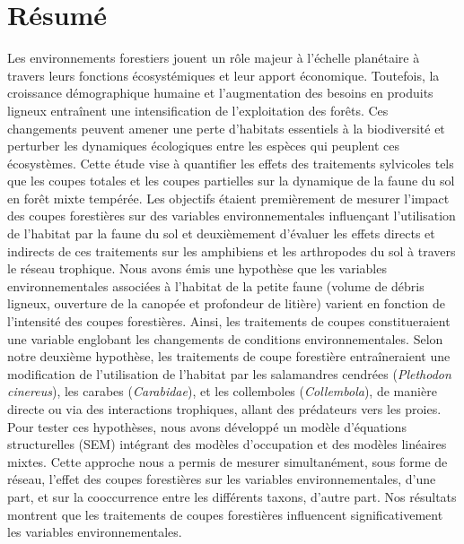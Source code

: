\chapter*{Résumé}               %
\label{chap-resume}             %

Les environnements forestiers jouent un rôle majeur à l’échelle planétaire à travers leurs fonctions écosystémiques et leur apport économique. 
Toutefois, la croissance démographique humaine et l’augmentation des besoins en produits ligneux entraînent une intensification de l'exploitation des forêts. 
Ces changements peuvent amener  une perte d'habitats essentiels à la biodiversité et perturber les dynamiques écologiques entre les espèces qui peuplent ces écosystèmes. 
Cette étude vise à quantifier les effets des traitements sylvicoles tels que les coupes totales et les coupes partielles sur la dynamique de la faune du sol en forêt mixte tempérée. 
Les objectifs étaient premièrement de mesurer l’impact des coupes forestières sur des variables environnementales influençant l’utilisation de l’habitat par la faune du sol 
et deuxièmement d’évaluer les effets directs et indirects de ces traitements sur les amphibiens et les arthropodes du sol à travers le réseau trophique. 
Nous avons émis une hypothèse que les variables environnementales associées à l’habitat de la petite faune (volume de débris ligneux, ouverture de la canopée et profondeur de litière) varient en fonction de l’intensité des coupes forestières. 
Ainsi, les traitements de coupes constitueraient une variable englobant les changements de conditions environnementales. 
Selon notre deuxième hypothèse, les traitements de coupe forestière entraîneraient une modification de l'utilisation de l'habitat 
par les salamandres cendrées (\textit{Plethodon cinereus}), les carabes (\textit{Carabidae}), et les collemboles (\textit{Collembola}), de manière directe ou via des interactions trophiques, 
allant des prédateurs vers les proies. 
Pour tester ces hypothèses, nous avons développé un modèle d’équations structurelles (SEM) intégrant des modèles d’occupation et des modèles linéaires mixtes. 
Cette approche nous a permis de mesurer simultanément, sous forme de réseau, l’effet des coupes forestières sur les variables environnementales, d’une part, et sur la cooccurrence entre les différents taxons, d’autre part. 
Nos résultats montrent que les traitements de coupes forestières influencent significativement les variables environnementales. 
